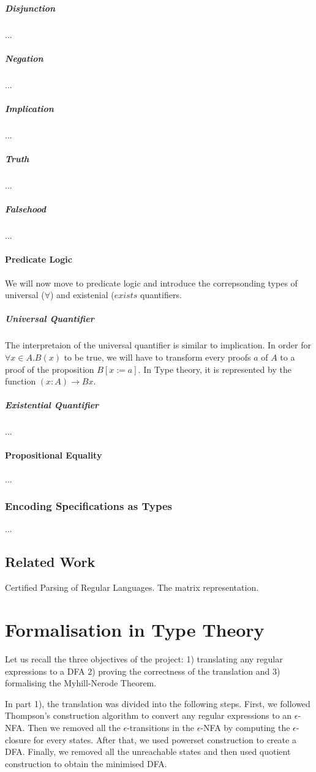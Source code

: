 \documentclass[twoside,openright,final]{bhamthesis}
\begin{document}
\subparagraph{Disjunction} ...

\subparagraph{Negation} ... 

\subparagraph{Implication} ...

\subparagraph{Truth} ...

\subparagraph{Falsehood} ...

\paragraph{Predicate Logic} We will now move to predicate logic and
introduce the correpsonding types of universal (\(\forall\)) and
existenial (\(exists\) quantifiers. 

\subparagraph{Universal Quantifier} The interpretaion of the universal quantifier is similar to
implication. In order for \(\forall x\in A. B(x)\) to be true, we will have
to transform every proofs \(a\) of \(A\) to a proof of the proposition
\(B[x:=a]\). In Type theory, it is represented by the function \((x :
A) \to B x\). 

\subparagraph{Existential Quantifier} ...

\paragraph{Propositional Equality} ... 

\subsubsection{Encoding Specifications as Types}
\par ...

\subsection{Related Work}
\par Certified Parsing of Regular Languages. The matrix representation.

\newpage
\section{Formalisation in Type Theory}
\par Let us recall the three objectives of the project: 1) translating any
regular expressions to a DFA 2) proving the correctness of the translation 
and 3) formalising the Myhill-Nerode Theorem. 

\par In part 1), the translation was divided into the following steps. First, we
followed Thompson's construction algorithm to convert any regular expressions to an
\(\epsilon\)-NFA. Then we removed all the \(\epsilon\)-transitions in
the \(\epsilon\)-NFA by computing the \(\epsilon\)-closure for every states. After that, we used powerset
construction to create a DFA. Finally, we removed all the unreachable
states and then used quotient construction to obtain the minimised
DFA. 
\end{document}
